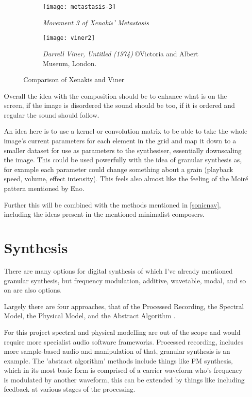 \begin{figure}
    \centering
    \begin{subfigure}[t]{.49\textwidth}
        \centering
        \texttt{[image: metastasis-3]}
        \caption*{\emph{Movement 3 of Xenakis' Metastasis}}
    \end{subfigure}
    \begin{subfigure}[t]{.49\textwidth}
        \centering
        \texttt{[image: viner2]}
        \caption*{\emph{Darrell Viner, Untitled (1974)} \copyright Victoria and
    Albert Museum, London.}
    \end{subfigure}
    \caption{Comparison of Xenakis and Viner}
    \label{xevicompare}
\end{figure}


Overall the idea with the composition should be to enhance what is on the
screen, if the image is disordered the sound should be too, if it is ordered
and regular the sound should follow. 

An idea here is to use a kernel or convolution matrix to be able to take the
whole image's current parameters for each element in the grid and map it down to
a smaller dataset for use as parameters to the synthesiser, essentially
downscaling the image. This could be used powerfully with the idea of granular
synthesis as, for example each parameter could change something about a grain
(playback speed, volume, effect intensity). This feels also almost like the
feeling of the Moir\'{e} pattern mentioned by Eno. 

Further this will be combined with the methods mentioned in
\autoref{sonicnav}, including the ideas present in the mentioned minimalist
composers.

\section{Synthesis}
There are many options for digital synthesis of which I've already mentioned
granular synthesis, but frequency modulation, additive, wavetable, modal, and so
on are also options.

Largely there are four approaches, that of the Processed Recording, the Spectral
Model, the Physical Model, and the Abstract Algorithm \citep{smith_2005}.

For this project spectral and physical modelling are out of the scope and would
require more specialist audio software frameworks. Processed recording, includes
more sample-based audio and manipulation of that, granular synthesis is an
example. The 'abstract algorithm' methods include things like FM synthesis,
which in its most basic form is comprised of a carrier waveform who's frequency
is modulated by another waveform, this can be extended by things like including
feedback at various stages of the processing.

